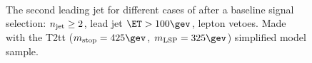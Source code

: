 \begin{figure}[h!]
  \centering
  ~~
  \\
  \caption{\label{fig:asymMotivation} The second leading jet \PT for different
  cases of \HT after a baseline signal selection: $\njet\geq2$, lead jet
  $\ET>100\gev$, lepton vetoes. Made with the T2tt ($m_{\rm
    stop}=425\gev$, $m_{\rm LSP}=325\gev$) simplified model sample.}
\end{figure}

